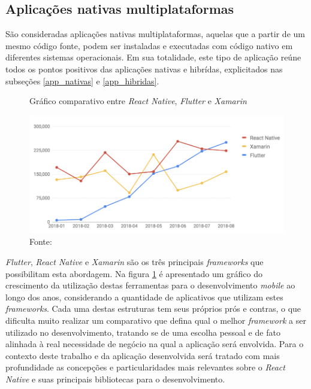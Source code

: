     \subsection{Aplicações nativas multiplataformas}
        \label{app_multiplataforma_nativa}
    
    São consideradas aplicações nativas multiplataformas, aquelas que a partir de um mesmo código fonte, podem ser instaladas e executadas com código nativo em diferentes sistemas operacionais. Em sua totalidade, este tipo de aplicação reúne todos os pontos positivos das aplicações nativas e hibrídas, explicitados nas subseções \ref{app_nativas} e \ref{app_hibridas}.
    
    \begin{figure}[h]
    \caption{Gráfico comparativo entre \textit{React Native}, \textit{Flutter} e \textit{Xamarin}}
    \centering %
    \includegraphics[width=12cm]{imagem/native-frameworks.jpg}
    \caption*{Fonte: \cite{Alferd2019}}
    \label{figura:native-frameworks}
    \end{figure}
    
    \textit{Flutter}, \textit{React Native} e \textit{Xamarin} são os três principais \textit{frameworks} que possibilitam esta abordagem. Na figura \ref{figura:native-frameworks} é apresentado um gráfico do crescimento da utilização destas ferramentas para o desenvolvimento \textit{mobile} ao longo dos anos, considerando a quantidade de aplicativos que utilizam estes \textit{frameworks}. Cada uma destas estruturas tem seus próprios prós e contras, o que dificulta muito realizar um comparativo que defina qual o melhor \textit{framework} a ser utilizado no desenvolvimento, tratando se de uma escolha pessoal e de fato alinhada à real necessidade de negócio na qual a aplicação será envolvida. Para o contexto deste trabalho e da aplicação desenvolvida será tratado com mais profundidade as concepções e particularidades mais relevantes sobre o \textit{React Native} e suas principais bibliotecas para o desenvolvimento.
    
